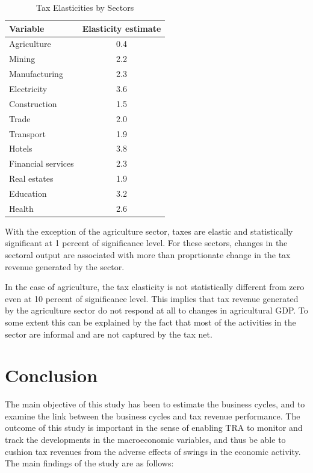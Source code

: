 \documentclass[12pt,a4paper,final]{article}
\begin{document}
\begin{table}[h]
\centering
\begin{small} 
\caption{Tax Elasticities by Sectors} 
\label{tab6}
\begin{tabular}{l c}
\toprule
\multicolumn{1}{l}{\textbf{Variable}} & \textbf{Elasticity estimate}\\ 
 \midrule
Agriculture & 0.4 \\
Mining & 2.2 \\
Manufacturing & 2.3\\
Electricity  & 3.6\\
Construction & 1.5 \\
Trade & 2.0\\
Transport & 1.9\\
Hotels & 3.8\\
Financial services & 2.3\\
Real estates & 1.9\\
Education & 3.2\\
Health & 2.6\\
\bottomrule
\end{tabular}
\end{small}
\end{table}

With the exception of the agriculture sector, taxes are elastic and statistically significant at 1 percent of significance level. For these sectors, changes in the sectoral output are associated with more than proprtionate change in the tax revenue generated by the sector. 

\newpage
In the case of agriculture, the tax elasticity is not statistically different from zero even at 10 percent of significance level. This implies that tax revenue generated by the agriculture sector do not respond at all to changes in agricultural GDP. To some extent this can be explained by the fact that most of the activities in the sector are informal and are not captured by the tax net.


\section{Conclusion}

The main objective of this study has been to estimate the business cycles, and to examine the link between the business cycles and tax revenue performance. The outcome of this study is important in the sense of enabling TRA to monitor and track the developments in the macroeconomic variables, and thus be able to cushion tax revenues from the adverse effects of swings in the economic activity. The main findings of the study are as follows:
\end{document}
